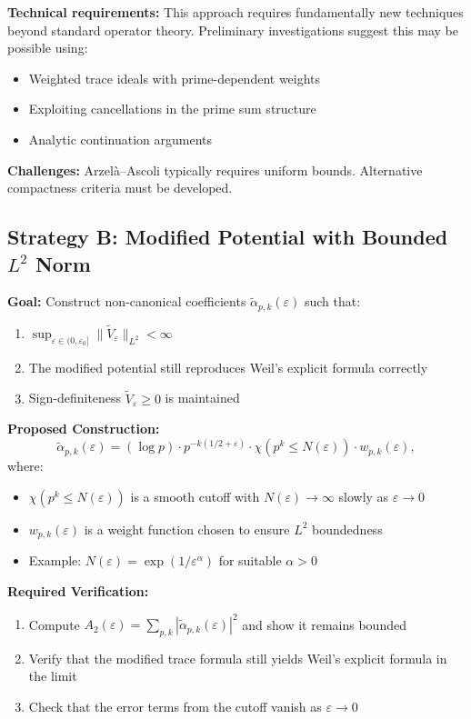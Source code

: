 ﻿\documentclass[12pt,a4paper]{article}
\theoremstyle{definition}
\theoremstyle{remark}
\begin{document}
\textbf{Technical requirements:} This approach requires fundamentally new techniques beyond standard operator theory. Preliminary investigations suggest this may be possible using:
\begin{itemize}
\item Weighted trace ideals with prime-dependent weights
\item Exploiting cancellations in the prime sum structure
\item Analytic continuation arguments
\end{itemize}

\textbf{Challenges:} Arzel\`a--Ascoli typically requires uniform bounds. Alternative compactness criteria must be developed.

\subsection{Strategy B: Modified Potential with Bounded $L^2$ Norm}

\textbf{Goal:} Construct non-canonical coefficients $\widetilde{\alpha}_{p,k}(\varepsilon)$ such that:
\begin{enumerate}
\item $\sup_{\varepsilon \in (0,\varepsilon_0]} \|\widetilde{V}_\varepsilon\|_{L^2} < \infty$
\item The modified potential still reproduces Weil's explicit formula correctly
\item Sign-definiteness $\widetilde{V}_\varepsilon \geq 0$ is maintained
\end{enumerate}

\textbf{Proposed Construction:}
\[
  \widetilde{\alpha}_{p,k}(\varepsilon) = (\log p) \cdot p^{-k(1/2+\varepsilon)} \cdot \chi\left(p^k \leq N(\varepsilon)\right) \cdot w_{p,k}(\varepsilon),
\]
where:
\begin{itemize}
\item $\chi(p^k \leq N(\varepsilon))$ is a smooth cutoff with $N(\varepsilon) \to \infty$ slowly as $\varepsilon \to 0$
\item $w_{p,k}(\varepsilon)$ is a weight function chosen to ensure $L^2$ boundedness
\item Example: $N(\varepsilon) = \exp(1/\varepsilon^\alpha)$ for suitable $\alpha > 0$
\end{itemize}

\textbf{Required Verification:}
\begin{enumerate}
\item Compute $A_2(\varepsilon) = \sum_{p,k} |\widetilde{\alpha}_{p,k}(\varepsilon)|^2$ and show it remains bounded
\item Verify that the modified trace formula still yields Weil's explicit formula in the limit
\item Check that the error terms from the cutoff vanish as $\varepsilon \to 0$
\end{enumerate}
\end{document}
